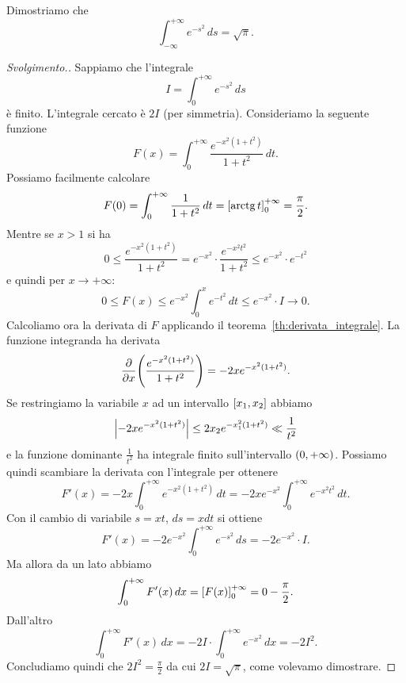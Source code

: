 \begin{exercise}
  \label{ex:integrale_gaussiana}%
Dimostriamo che 
\[
  \int_{-\infty}^{+\infty} e^{-s^2}\, ds = \sqrt \pi.
\]
\end{exercise}
%
\begin{proof}[Svolgimento.]
Sappiamo che l'integrale
\[
  I = \int_{0}^{+\infty} e^{-s^2}\, ds
\]
è finito. 
L'integrale cercato è $2I$ (per simmetria).
Consideriamo la seguente funzione
\[ 
  F(x) = \int_0^{+\infty} \frac{e^{-x^2(1+t^2)}}{1+t^2}\, dt.
\]
Possiamo facilmente calcolare 
\[
  F(0) = \int_0^{+\infty} \frac{1}{1+t^2}\, dt = {\left[ \operatorname{arctg} t \right]}_0^{+\infty} = \frac \pi 2.
\]
Mentre se $x>1$ si ha 
\[
  0\le \frac{e^{-x^2(1+t^2)}}{1+t^2}
  = e^{-x^2}\cdot \frac{e^{-x^2t^2}}{1+t^2}
  \le e^{-x^2}\cdot e^{-t^2}
\]
e quindi per $x\to +\infty$:
\[
  0\le F(x) \le e^{-x^2} \int_0^x e^{-t^2}\, dt \le e^{-x^2}\cdot I \to 0.
\]
Calcoliamo ora la derivata di $F$ applicando il teorema~\ref{th:derivata_integrale}.
La funzione integranda ha derivata 
\[
 \frac{\partial}{\partial x}{\left( \frac{e^{-x^2(1+t^2)}}{1+t^2} \right)}
 = -2x e^{-x^2(1+t^2)}.
\]
Se restringiamo la variabile $x$ ad un intervallo $\left[x_1,x_2\right]$
abbiamo 
\[
 {\left|-2x e^{-x^2(1+t^2)}\right|}
 \le 2 x_2 e^{-x_1^2(1+t^2)} \ll \frac{1}{t^2}
\]
e la funzione dominante $\frac{1}{t^2}$ ha integrale finito sull'intervallo 
$\left(0,+\infty\right)$. 
Possiamo quindi scambiare la derivata con l'integrale per ottenere 
\[
 F'(x) = - 2 x\int_0^{+\infty} e^{-x^2(1+t^2)}\, dt
       = - 2 x e^{-x^2}\int_0^{+\infty} e^{-x^2t^2}\, dt. 
\]
Con il cambio di variabile $s=xt$, $ds=x dt$ si ottiene
\[
 F'(x) = -2 e^{-x^2}\int_0^{+\infty} e^{-s^2}\, ds = - 2 e^{-x^2}\cdot I.
\]
Ma allora da un lato abbiamo 
\[
  \int_0^{+\infty} F'(x)\, dx 
  = {\left[ F(x) \right]}_0^{+\infty}  = 0 - \frac{\pi}{2}.
\]
Dall'altro 
\[
 \int_0^{+\infty} F'(x)\, dx 
 = - 2 I \cdot \int_0^{+\infty} e^{-x^2}\, dx
 = - 2 I^2. 
\]
Concludiamo quindi che $2I^2 = \frac \pi 2$ da cui 
$2I=\sqrt \pi$, come volevamo dimostrare.
\end{proof}

